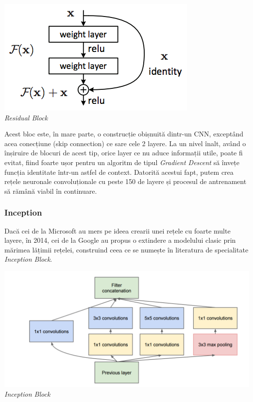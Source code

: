 \begin{center}
\includegraphics[scale=0.7]{residualBlock} \\
\textit{Residual Block}
\end{center}

Acest bloc este, în mare parte, o construcție obișnuită dintr-un CNN, exceptând acea conecțiune (skip connection) ce sare cele 2 layere. La un nivel înalt, având o înșiruire de blocuri de acest tip, orice layer ce nu aduce informații utile, poate fi evitat, fiind foarte ușor pentru un algoritm de tipul \textit{Gradient Descent} să învețe funcția identitate într-un astfel de context. Datorită acestui fapt, putem crea rețele neuronale convoluționale cu peste 150 de layere și procesul de antrenament să rămână viabil în continuare.

\subsubsection{Inception}
Dacă cei de la Microsoft au mers pe ideea crearii unei rețele cu foarte multe layere, în 2014, cei de la Google au propus o extindere a modelului clasic prin mărimea lățimii rețelei, construind ceea ce se numește în literatura de specialitate \textit{Inception Block}.

\begin{center}
\includegraphics[scale=0.4]{inceptionBlock} \\
\textit{Inception Block}
\end{center}


